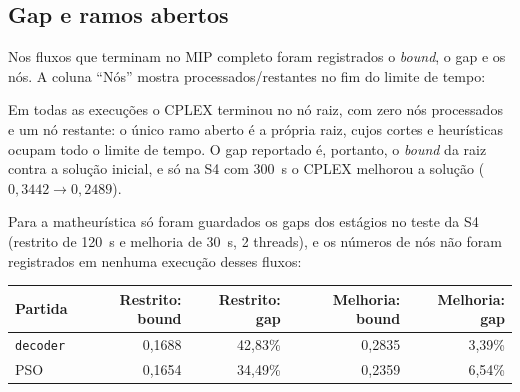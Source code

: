 \documentclass[11pt,a4paper]{article}
\begin{document}
\subsection{Gap e ramos abertos}

Nos fluxos que terminam no MIP completo foram registrados o \emph{bound}, o
gap e os nós. A coluna ``Nós'' mostra processados/restantes no fim do limite
de tempo:

\begin{center}
\small
{}%
\end{center}

Em todas as execuções o CPLEX terminou no nó raiz, com zero nós processados e
um nó restante: o único ramo aberto é a própria raiz, cujos cortes e
heurísticas ocupam todo o limite de tempo. O gap reportado é, portanto, o
\emph{bound} da raiz contra a solução inicial, e só na S4 com 300~s o CPLEX
melhorou a solução ($0{,}3442\to0{,}2489$).

Para a matheurística só foram guardados os gaps dos estágios no teste da S4
(restrito de 120~s e melhoria de 30~s, 2 threads), e os números de nós não
foram registrados em nenhuma execução desses fluxos:

\begin{center}
\small
\begin{tabular}{lrrrr}
\toprule
Partida & Restrito: bound & Restrito: gap & Melhoria: bound & Melhoria: gap \\
\midrule
\texttt{decoder} & 0,1688 & 42,83\% & 0,2835 & 3,39\% \\
PSO & 0,1654 & 34,49\% & 0,2359 & 6,54\% \\
\bottomrule
\end{tabular}
\end{center}
\end{document}

